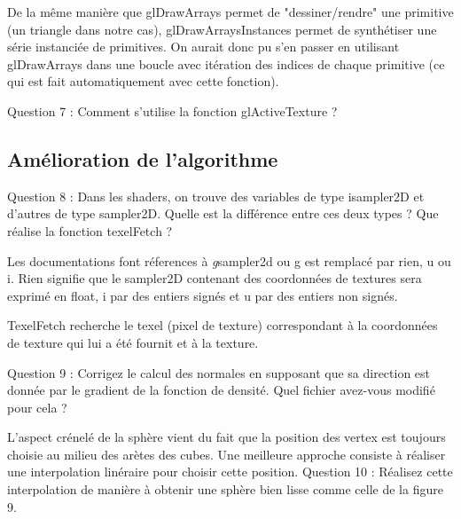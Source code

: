 \documentclass[a4paper]{article}
\begin{document}
De la même manière que glDrawArrays permet de "dessiner/rendre" une primitive (un triangle dans notre cas), glDrawArraysInstances permet de synthétiser une série instanciée de primitives. On aurait donc pu s'en passer en utilisant glDrawArrays dans une boucle avec itération des indices de chaque primitive (ce qui est fait automatiquement avec cette fonction). 

Question 7 : Comment s’utilise la fonction glActiveTexture ? 


\subsection{Amélioration de l'algorithme}

Question 8 : Dans les shaders, on trouve des variables de type isampler2D et d’autres de type sampler2D. Quelle est la
différence entre ces deux types ?  Que réalise la fonction texelFetch ?

Les documentations font réferences à \textit{g}sampler2d ou g est remplacé par rien, u ou i. Rien signifie que le sampler2D contenant des coordonnées de textures sera exprimé en float, i par des entiers signés et u par des entiers non signés. 

TexelFetch recherche le texel (pixel de texture) correspondant à la coordonnées de texture qui lui a été fournit et à la texture. 

Question 9 : Corrigez le calcul des normales en supposant que sa direction est donnée par le gradient de la fonction de
densité. Quel fichier avez-vous modifié pour cela ?



L’aspect crénelé de la sphère vient du fait que la position des vertex est toujours choisie au milieu des arètes des cubes.
Une meilleure approche consiste à réaliser une interpolation linéraire pour choisir cette position.
Question 10 : Réalisez cette interpolation de manière à obtenir une sphère bien lisse comme celle de la figure 9.
\end{document}
